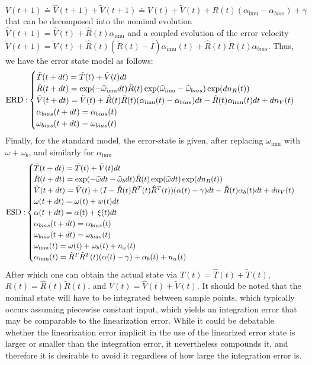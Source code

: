 \documentclass[]{article}
\def\w{\omega}
\def\imu{_\mathrm{imu}}
\begin{document}
{\begin{equation}
V(t+1) \doteq \hat V(t+1) + \tilde V(t+1) \doteq \hat V(t) + \tilde V(t) + R(t)(\alpha\imu  - \alpha_{bias}) + \gamma %
\end{equation}
that can be decomposed into the nominal evolution $\hat V(t+1) = \hat V(t) + \hat R(t)\alpha\imu $ and a coupled evolution of the error velocity $\tilde V(t+1) = \tilde V(t) +\hat R(t)(\tilde R(t) -I)\alpha\imu (t) + \hat R(t)\tilde R(t) \alpha_{bias}$. Thus, we have the error state model as follows:
\begin{equation}
{\rm ERD:} 
\begin{cases}
\tilde T(t+dt) = \tilde T(t) + \tilde V(t)dt\\
\tilde R(t+dt) = \exp(-\widehat \w\imu dt)\tilde R(t) \exp(\widehat \w\imu  - \widehat \w_{bias})\exp(dn_R(t))\\
\tilde V(t+dt) = \tilde V(t) +\hat R(t)\tilde R(t)(\alpha\imu (t) - \alpha_{bias})dt - \hat R(t)\alpha\imu (t)dt + dn_V(t)\\
\alpha_{bias}(t+dt)  = \alpha_{bias}(t) \\
\w_{bias}(t+dt) = \w_{bias}(t) \\
\end{cases}
\end{equation}
Finally, for the standard model, the error-state is given, after replacing $\w\imu $ with $\w + \w_b$, and similarly for $\alpha\imu $
\begin{equation}
{\rm ESD:}
\begin{cases}
\tilde T(t+dt) = \tilde T(t) + \tilde V(t)dt\\
\tilde R(t+dt) = \exp(-\widehat \w dt -\widehat \w_b dt)\tilde R(t) \exp(\widehat \w dt)\exp(dn_R(t))\\
\tilde V(t+dt) = \tilde V(t) + (I - \hat R(t){\tilde R}^T(t) {\hat R}^T(t)) (\alpha(t) - \gamma)dt - \hat R(t)\alpha_{b}(t)dt + dn_V(t)\\
\w(t+dt) =  \w(t) + w(t)dt \\
\alpha(t+dt) = \alpha(t) + \xi(t)dt \\
\alpha_{bias}(t+dt)  = \alpha_{bias}(t) \\
\w_{bias}(t+dt) = \w_{bias}(t) \\
\w\imu (t) = \w(t) + \w_b(t) + n_{\w}(t) \\ 
\alpha\imu (t) = {\tilde R}^T {\hat R}^T(t) (\alpha(t)- \gamma) + \alpha_b(t) + n_{\alpha}(t) 
\end{cases}
\end{equation}
After which one can obtain the actual state via $T(t) = \hat T(t) + \tilde T(t)$, $R(t) = \hat R(t) \tilde R(t)$, and $V(t) = \hat V(t) + \tilde V(t)$. 
%
It should be noted that the nominal state will have to be integrated between sample points, which typically occurs assuming piecewise constant input, which yields an integration error that may be comparable to the linearization error. While it could be debatable whether the linearization error implicit in the use of the linearized error state is larger or smaller than the integration error, it nevertheless compounds it, and therefore it is desirable to avoid it regardless of how large the integration error is.
%
}
\end{document}
